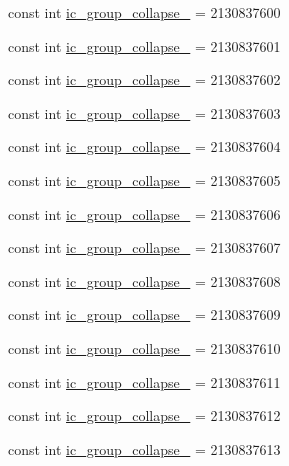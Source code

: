 \begin{CompactItemize}
\item 
const int \hyperlink{class__2doo_1_1_droid_1_1_resource_1_1_drawable_f0f7bd3a714a2d53656beb454ad37bdf}{ic\_\-group\_\-collapse\_} = 2130837600
\item 
const int \hyperlink{class__2doo_1_1_droid_1_1_resource_1_1_drawable_e11f6c4949aeccdcde0dcae54622a858}{ic\_\-group\_\-collapse\_} = 2130837601
\item 
const int \hyperlink{class__2doo_1_1_droid_1_1_resource_1_1_drawable_bb3d75ed0d24b097c196819dd86d2739}{ic\_\-group\_\-collapse\_} = 2130837602
\item 
const int \hyperlink{class__2doo_1_1_droid_1_1_resource_1_1_drawable_1687003331bc28276daedefdf94e8f43}{ic\_\-group\_\-collapse\_} = 2130837603
\item 
const int \hyperlink{class__2doo_1_1_droid_1_1_resource_1_1_drawable_e3f4578b6801001be5d8007ae14fda50}{ic\_\-group\_\-collapse\_} = 2130837604
\item 
const int \hyperlink{class__2doo_1_1_droid_1_1_resource_1_1_drawable_c6dcede4cffd11e0b510cc1095d30776}{ic\_\-group\_\-collapse\_} = 2130837605
\item 
const int \hyperlink{class__2doo_1_1_droid_1_1_resource_1_1_drawable_4d03cb7acf646a52d9601dc16f43d4de}{ic\_\-group\_\-collapse\_} = 2130837606
\item 
const int \hyperlink{class__2doo_1_1_droid_1_1_resource_1_1_drawable_94430c92dc61579e10c58f662b6d4bc2}{ic\_\-group\_\-collapse\_} = 2130837607
\item 
const int \hyperlink{class__2doo_1_1_droid_1_1_resource_1_1_drawable_876dee7cb256e78fd5b54e8e8a15ca17}{ic\_\-group\_\-collapse\_} = 2130837608
\item 
const int \hyperlink{class__2doo_1_1_droid_1_1_resource_1_1_drawable_1a4c3cc2309259f321e8be3b5bd7b405}{ic\_\-group\_\-collapse\_} = 2130837609
\item 
const int \hyperlink{class__2doo_1_1_droid_1_1_resource_1_1_drawable_5e7922e8358b0aa7aef0e8da4579c745}{ic\_\-group\_\-collapse\_} = 2130837610
\item 
const int \hyperlink{class__2doo_1_1_droid_1_1_resource_1_1_drawable_186f073224e3be96eb33518ab2bbed61}{ic\_\-group\_\-collapse\_} = 2130837611
\item 
const int \hyperlink{class__2doo_1_1_droid_1_1_resource_1_1_drawable_19f55b45e6187db65e066e672f23dbe2}{ic\_\-group\_\-collapse\_} = 2130837612
\item 
const int \hyperlink{class__2doo_1_1_droid_1_1_resource_1_1_drawable_6d840ae2d627ac671369c3266135f12e}{ic\_\-group\_\-collapse\_} = 2130837613

\end{CompactItemize}
